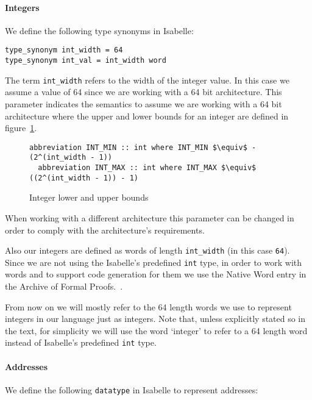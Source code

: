 \paragraph{Integers}

We define the following type synonyms in Isabelle:

\begin{lstlisting}[frame=single]
type_synonym int_width = 64
type_synonym int_val = int_width word
\end{lstlisting}


The term \verb|int_width| refers to the width of the integer value.
In this case we assume a value of 64 since we are working with a 64 bit architecture.
This parameter indicates the semantics to assume we are working with a 64 bit architecture where the upper and lower bounds for an integer are defined in figure~\ref{fig:int_bounds}.

\begin{figure}
  \begin{lstlisting}[frame=single, mathescape=true]
  abbreviation INT_MIN :: int where INT_MIN $\equiv$ - (2^(int_width - 1))
  abbreviation INT_MAX :: int where INT_MAX $\equiv$  ((2^(int_width - 1)) - 1)
  \end{lstlisting}

  \caption{Integer lower and upper bounds}
  \label{fig:int_bounds}
\end{figure}

When working with a different architecture this parameter can be changed in order to comply with the architecture's requirements.

Also our integers are defined as words of length \verb|int_width| (in this case \verb|64|).
Since we are not using the Isabelle's predefined \verb|int| type, in order to work with words and to support code generation for them we use the Native Word entry in the Archive of Formal Proofs.~\parencite{Native_Word-AFP}.

From now on we will mostly refer to the 64 length words we use to represent integers in our language just as integers.
Note that, unless explicitly stated so in the text, for simplicity we will use the word `integer' to refer to a 64 length word instead of Isabelle's predefined \verb|int| type.

\paragraph{Addresses}

We define the following \verb|datatype| in Isabelle to represent addresses:

